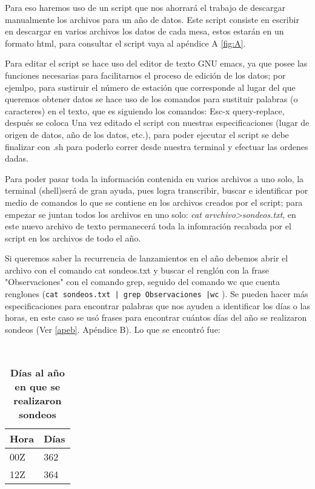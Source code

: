 \documentclass[12pt]{article}
\begin{document}
Para eso haremos uso de un script que nos ahorrará el trabajo de descargar manualmente los archivos para un año de datos. Este script consiste en escribir en descargar en varios archivos los datos de cada mesa, estos estarán en un formato html, para consultar el script vaya al apéndice A \ref{fig:A}.

Para editar el script se hace uso del editor de texto GNU emacs, ya que posee las funciones necesarias para facilitarnos el proceso de edición de los datos; por ejemlpo, para sustiruir el número de estación que corresponde al lugar del que queremos obtener datos se hace uso de los comandos para sustituir palabras (o caracteres) en el texto, que es siguiendo los comandos: Esc-x query-replace, después se coloca  Una vez editado el script con nuestras especificaciones (lugar de origen de datos, año de los datos, etc.), para poder ejecutar el script se debe finalizar con .sh para poderlo correr desde nuestra terminal y efectuar las ordenes dadas.

Para poder pasar toda la información contenida en varios archivos a uno solo, la terminal (shell)será de gran ayuda, pues logra transcribir, buscar e identificar por medio de comandos lo que se contiene en los archivos creados por el script; para empezar se juntan todos los archivos en uno solo: \textit{cat arvchivo\textasteriskcentered \textgreater sondeos.txt}, en este nuevo archivo de texto permanecerá toda la infomración recabada por el script en los archivos de todo el año.

Si queremos saber la recurrencia de lanzamientos en el año debemos abrir el archivo con el comando cat sondeos.txt y buscar el renglón con la frase "Observaciones" con el comando grep, seguido del comando wc que cuenta renglones (\verb#cat sondeos.txt | grep Observaciones |wc# ). Se pueden hacer más especificaciones para encontrar palabras que nos ayuden a identificar los días o las horas, en este caso se usó  frases para encontrar cuántos días del año se realizaron sondeos (Ver \ref{apeb}. Apéndice B). Lo que se encontró fue:

\begin{table}[h]
\caption{\textbf{Días al año en que se realizaron sondeos}}
\label{fig:tabda}
\centering
\
\begin{tabular}{@{}|l|l|@{}}
\toprule
Hora & Días  \\ \midrule
00Z   & 362  \\
12Z  & 364 
\end{tabular}
\end{table}
\end{document}
